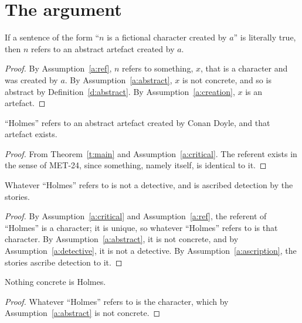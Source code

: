 \documentclass{situationist-preprint}
\begin{document}
\section{The argument}

\begin{theorem}\label{t:main}
If a sentence of the form \enquote{$n$ is a fictional character created by $a$} is literally true, then $n$ refers to an abstract artefact created by $a$.
\end{theorem}

\begin{proof}
By Assumption~\ref{a:ref}, $n$ refers to something, $x$, that is a character and was created by $a$. By Assumption~\ref{a:abstract}, $x$ is not concrete, and so is abstract by Definition~\ref{d:abstract}. By Assumption~\ref{a:creation}, $x$ is an artefact.
\end{proof}

\begin{corollary}\label{c:holmes}
\enquote{Holmes} refers to an abstract artefact created by Conan Doyle, and that artefact exists.
\end{corollary}

\begin{proof}
From Theorem~\ref{t:main} and Assumption~\ref{a:critical}. The referent exists in the sense of MET-24, since something, namely itself, is identical to it.
\end{proof}

\begin{corollary}\label{c:detective}
Whatever \enquote{Holmes} refers to is not a detective, and is ascribed detection by the stories.
\end{corollary}

\begin{proof}
By Assumption~\ref{a:critical} and Assumption~\ref{a:ref}, the referent of \enquote{Holmes} is a character; it is unique, so whatever \enquote{Holmes} refers to is that character. By Assumption~\ref{a:abstract}, it is not concrete, and by Assumption~\ref{a:detective}, it is not a detective. By Assumption~\ref{a:ascription}, the stories ascribe detection to it.
\end{proof}

\begin{corollary}\label{c:noconcrete}
Nothing concrete is Holmes.
\end{corollary}

\begin{proof}
Whatever \enquote{Holmes} refers to is the character, which by Assumption~\ref{a:abstract} is not concrete.
\end{proof}
\end{document}
